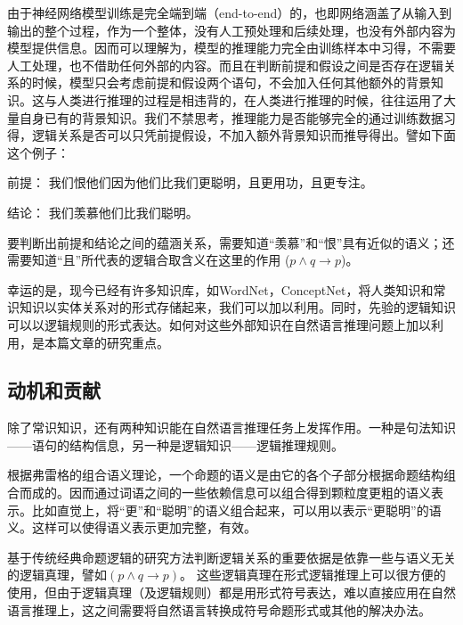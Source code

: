 \documentclass[UTF8,11pt,a4paper,nofonts]{ctexart}
\begin{document}
由于神经网络模型训练是完全端到端（end-to-end）\cite{Sutskever2014SequenceTS}的，也即网络涵盖了从输入到输出的整个过程，作为一个整体，没有人工预处理和后续处理，也没有外部内容为模型提供信息。因而可以理解为，模型的推理能力完全由训练样本中习得，不需要人工处理，也不借助任何外部的内容。而且在判断前提和假设之间是否存在逻辑关系的时候，模型只会考虑前提和假设两个语句，不会加入任何其他额外的背景知识。这与人类进行推理的过程是相违背的，在人类进行推理的时候，往往运用了大量自身已有的背景知识。我们不禁思考，推理能力是否能够完全的通过训练数据习得，逻辑关系是否可以只凭前提假设，不加入额外背景知识而推导得出。譬如下面这个例子：


前提： 我们恨他们因为他们比我们更聪明，且更用功，且更专注。

结论： 我们羡慕他们比我们聪明。

要判断出前提和结论之间的蕴涵关系，需要知道“羡慕”和“恨”具有近似的语义；还需要知道“且”所代表的逻辑合取含义在这里的作用
($p \land q \to p$)。

幸运的是，现今已经有许多知识库，如WordNet，ConceptNet，将人类知识和常识知识以实体关系对的形式存储起来，我们可以加以利用。同时，先验的逻辑知识可以以逻辑规则的形式表达。如何对这些外部知识在自然语言推理问题上加以利用，是本篇文章的研究重点。





\subsection{动机和贡献}




除了常识知识，还有两种知识能在自然语言推理任务上发挥作用。一种是句法知识——语句的结构信息，另一种是逻辑知识——逻辑推理规则。

根据弗雷格的组合语义理论，一个命题的语义是由它的各个子部分根据命题结构组合而成的。因而通过词语之间的一些依赖信息可以组合得到颗粒度更粗的语义表示。比如直觉上，将“更”和“聪明”的语义组合起来，可以用以表示“更聪明”的语义。这样可以使得语义表示更加完整，有效。

基于传统经典命题逻辑的研究方法判断逻辑关系的重要依据是依靠一些与语义无关的逻辑真理，譬如$(p\land q \to p)$。
这些逻辑真理在形式逻辑推理上可以很方便的使用，但由于逻辑真理（及逻辑规则）都是用形式符号表达，难以直接应用在自然语言推理上，这之间需要将自然语言转换成符号命题形式或其他的解决办法。
\end{document}
